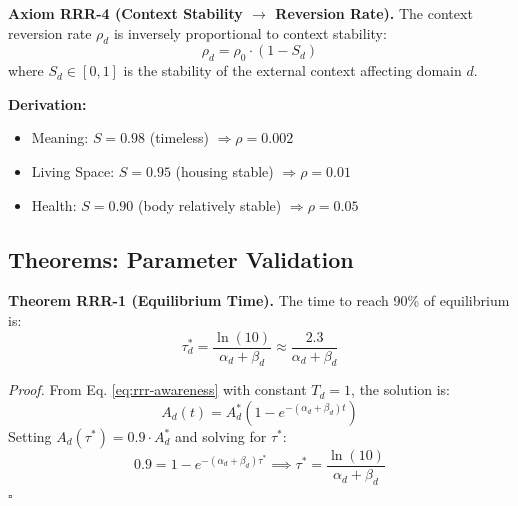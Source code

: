 \begin{tcolorbox}[colback=red!5!white, colframe=red!75!black, title=Axiom RRR-4: Context Stability]
\textbf{Axiom RRR-4 (Context Stability $\rightarrow$ Reversion Rate).}
The context reversion rate $\rho_d$ is inversely proportional to context stability:
\begin{equation}
\rho_d = \rho_0 \cdot (1 - S_d)
\end{equation}
where $S_d \in [0,1]$ is the stability of the external context affecting domain $d$.

\textbf{Derivation:}
\begin{itemize}[nosep]
\item Meaning: $S = 0.98$ (timeless) $\Rightarrow \rho = 0.002$
\item Living Space: $S = 0.95$ (housing stable) $\Rightarrow \rho = 0.01$
\item Health: $S = 0.90$ (body relatively stable) $\Rightarrow \rho = 0.05$
\end{itemize}
\end{tcolorbox}

\subsection{Theorems: Parameter Validation}

\begin{tcolorbox}[colback=green!5!white, colframe=green!75!black, title=Theorem RRR-1: Equilibrium Time Formula]
\textbf{Theorem RRR-1 (Equilibrium Time).}
The time to reach 90\% of equilibrium is:
\begin{equation}
\tau_d^* = \frac{\ln(10)}{\alpha_d + \beta_d} \approx \frac{2.3}{\alpha_d + \beta_d}
\end{equation}

\textit{Proof.}
From Eq. \eqref{eq:rrr-awareness} with constant $T_d = 1$, the solution is:
\begin{equation}
A_d(t) = A_d^* \left(1 - e^{-(\alpha_d + \beta_d)t}\right)
\end{equation}
Setting $A_d(\tau^*) = 0.9 \cdot A_d^*$ and solving for $\tau^*$:
\begin{equation}
0.9 = 1 - e^{-(\alpha_d + \beta_d)\tau^*} \implies \tau^* = \frac{\ln(10)}{\alpha_d + \beta_d}
\end{equation}
\hfill $\square$
\end{tcolorbox}

